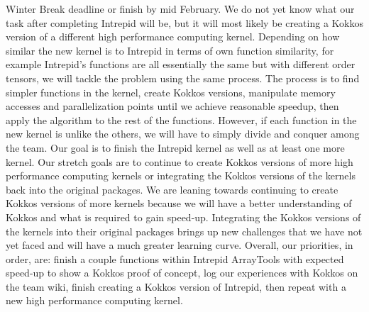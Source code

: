 \documentclass{hmcclinic}
\begin{document}
Winter Break deadline or finish by mid February. We do not yet know what our task after completing
Intrepid will be, but it will most likely be creating a Kokkos version of a different high 
performance computing kernel. Depending on how similar the new kernel is to Intrepid in terms of
own function similarity, for example Intrepid's functions are all essentially the same but with 
different order tensors, we will tackle the problem using the same process. The process is to find
simpler functions in the kernel, create Kokkos versions, manipulate memory accesses and 
parallelization points until we achieve reasonable speedup, then apply the algorithm to the rest 
of the functions. However, if each function in the new kernel is unlike the others, we will have 
to simply divide and conquer among the team. Our goal is to finish the Intrepid kernel as well as
at least one more kernel. Our stretch goals are to continue to create Kokkos versions of more high
performance computing kernels or integrating the Kokkos versions of the kernels back into the 
original packages. We are leaning towards continuing to create Kokkos versions of more kernels 
because we will have a better understanding of Kokkos and what is required to gain speed-up. 
Integrating the Kokkos versions of the kernels into their original packages brings up new 
challenges that we have not yet faced and will have a much greater learning curve. Overall, our 
priorities, in order, are: finish a couple functions within Intrepid ArrayTools with expected 
speed-up to show a Kokkos proof of concept, log our experiences with Kokkos on the team wiki, 
finish creating a Kokkos version of Intrepid, then repeat with a new high performance computing kernel.
\end{document}
